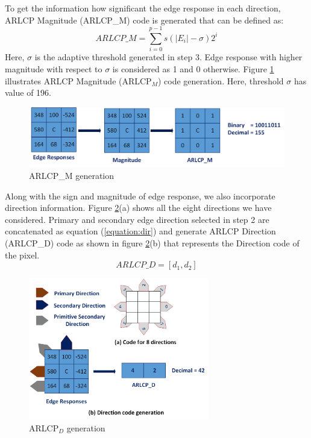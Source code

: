 \documentclass[12pt]{article}
\begin{document}
To get the information how significant the edge response in each direction, ARLCP Magnitude (ARLCP\_M) code is generated that can be defined as: \\


\begin{equation}
ARLCP\_M=\sum\limits_{i=0}^{p-1}{s(|{{E}_{i}}|-\sigma ){{2}^{i}}}
\label{eqn:arlcpM}
\end{equation}
Here, $\sigma$ is the adaptive threshold generated in step 3. Edge response with higher magnitude with respect to $\sigma$ is considered as 1 and 0 otherwise. Figure \ref{fig:mag} illustrates ARLCP Magnitude (ARLCP$_M$) code generation. Here, threshold $\sigma$ has value of 196.
\begin{figure}[H]
	\begin{center}
		\centering
		\includegraphics[width=\textwidth]{mag.png}
		\caption{ARLCP\_M generation}
		\label{fig:mag}
	\end{center}
\end{figure}

Along with the sign and magnitude of edge response, we also incorporate direction information. Figure \ref{fig:dir}(a) shows all the eight directions we have considered. Primary and secondary edge direction selected in step 2 are concatenated as equation (\ref{equation:dir}) and generate ARLCP Direction (ARLCP\_D) code as shown in figure \ref{fig:dir}(b) that represents the Direction code of the pixel.\\
\begin{equation}
 ARLCP\_D = [d_1 ,d_2]
 \label{equation:dir}
\end{equation}
\vspace*{0.5cm}
\begin{figure}[H]
	\begin{center}
		\centering
		\includegraphics[width=0.7\textwidth]{dir.png}
		\caption{ARLCP$_D$ generation}
		\label{fig:dir}
	\end{center}
\end{figure}
\end{document}
